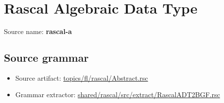 \chapter{Rascal Algebraic Data Type}

 Source name: \textbf{rascal-a}

\section{Source grammar}

\begin{itemize}
\item Source artifact: \href{http://github.com/grammarware/slps/blob/master/topics/fl/rascal/Abstract.rsc}{topics/fl/rascal/Abstract.rsc}
\item Grammar extractor: \href{http://github.com/grammarware/slps/blob/master/shared/rascal/src/extract/RascalADT2BGF.rsc}{shared/rascal/src/extract/RascalADT2BGF.rsc}
\end{itemize}


